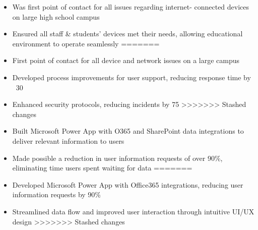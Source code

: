 \par\bigskip
{}
\par\smallskip
\begin{minipage}{13.75cm}
  \begin{minipage}{6.5cm}
    \begin{itemize}
<<<<<<< Updated upstream
      \item Was first point of contact for all issues regarding internet-
            connected devices on large high school campus
      \item Ensured all staff \& students' devices met their needs,
            allowing educational environment to operate seamlessly
=======
      \item First point of contact for all device and network issues on a large campus
      \item Developed process improvements for user support, reducing response time by ~30%
      \item Enhanced security protocols, reducing incidents by 75%
>>>>>>> Stashed changes
    \end{itemize}
  \end{minipage}
  \hfill
  \begin{minipage}{6.5cm}
    \begin{itemize}
<<<<<<< Updated upstream
      \item Built Microsoft Power App with O365 and SharePoint data
            integrations to deliver relevant information to users
      \item Made possible a reduction in user information requests of
            over 90\%, eliminating time users spent waiting for data
=======
      \item Developed Microsoft Power App with Office365 integrations, reducing user information requests by 90\%
      \item Streamlined data flow and improved user interaction through intuitive UI/UX design
>>>>>>> Stashed changes
    \end{itemize}
  \end{minipage}
\end{minipage}
\par\smallskip
\divider

